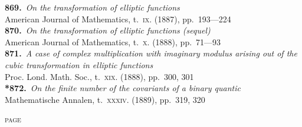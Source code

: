 \documentclass[11pt,a4paper]{article}
\providecommand{\textsc}[1]{{\scshape #1}}
\begin{document}
\textbf{869.}~\textit{On the transformation of elliptic functions}~\\
\hspace*{2em}American Journal of Mathematics, t.~\textsc{ix}. (1887), pp.~193---224\\[0.3em]
\textbf{870.}~\textit{On the transformation of elliptic functions (sequel)}~\\
\hspace*{2em}American Journal of Mathematics, t.~\textsc{x}. (1888), pp.~71---93\\[0.3em]
\textbf{871.}~\textit{A case of complex multiplication with imaginary modulus arising out of the cubic transformation in elliptic functions}~\\
\hspace*{2em}Proc. Lond. Math. Soc., t.~\textsc{xix}. (1888), pp.~300, 301\\[0.3em]
\textbf{*872.}~\textit{On the finite number of the covariants of a binary quantic}~\\
\hspace*{2em}Mathematische Annalen, t.~\textsc{xxxiv}. (1889), pp.~319, 320

\clearpage

\thispagestyle{plain}
\vspace*{1em}
\hfill\textsc{page}
\end{document}
